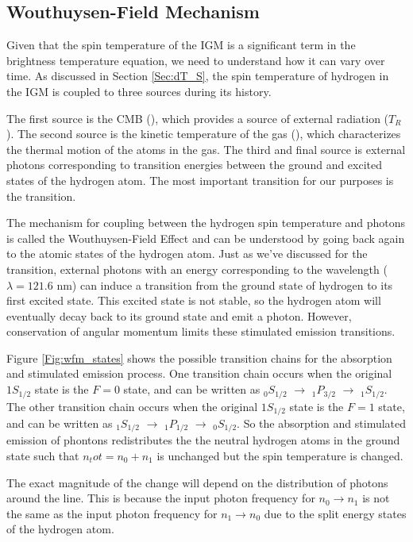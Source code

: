 \subsection{Wouthuysen-Field Mechanism}\label{Sec:WFM}
Given that the spin temperature of the IGM is a significant term in the brightness temperature equation, we need to understand how it can vary over time. As discussed in Section \ref{Sec:dT_S}, the spin temperature of hydrogen in the IGM is coupled to three sources during its history. 

The first source is the CMB (\tg), which provides a source of external radiation ($T_R$). The second source is the kinetic temperature of the gas (\tk), which characterizes the thermal motion of the atoms in the gas. The third and final source is external photons corresponding to transition energies between the ground and excited states of the hydrogen atom. The most important transition for our purposes is the \lya  transition. 

The mechanism for coupling between the hydrogen spin temperature and \lya  photons is called the Wouthuysen-Field Effect \cite{wouthuysen_1952}\cite{field_1958} and can be understood by going back again to the atomic states of the hydrogen atom. Just as we've discussed for the \cm transition, external photons with an energy corresponding to the \lya  wavelength ($\lambda = 121.6$ nm) can induce a transition from the ground state of hydrogen to its first excited state. This excited state is not stable, so the hydrogen atom will eventually decay back to its ground state and emit a photon. However, conservation of angular momentum limits these stimulated emission transitions. 

Figure \ref{Fig:wfm_states} shows the possible transition chains for the \lya absorption and stimulated emission process. One transition chain occurs when the original $1S_{1/2}$ state is the $F=0$ state, and can be written as $_0S_{1/2}$ $\rightarrow$ $_1P_{3/2}$ $\rightarrow$ $_1S_{1/2}$. The other transition chain occurs when the original $1S_{1/2}$ state is the $F=1$ state, and can be written as $_1S_{1/2}$ $\rightarrow$ $_1P_{1/2}$ $\rightarrow$ $_0S_{1/2}$. So the absorption and stimulated emission of \lya phontons redistributes the the neutral hydrogen atoms in the ground state such that $n_tot = n_0 + n_1$ is unchanged but the spin temperature is changed. 

The exact magnitude of the change will depend on the distribution of photons around the \lya  line. This is because the input photon frequency for $n_0 \rightarrow n_1$ is not the same as the input photon frequency for $n_1 \rightarrow n_0$ due to the split energy states of the hydrogen atom. 

